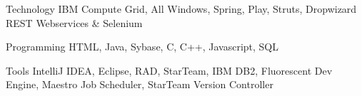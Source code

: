 

\begin{cvskills}

  \cvskill
    {Technology} %
    {IBM Compute Grid, All Windows, Spring, Play, Struts, Dropwizard REST Webservices \& Selenium} %

  \cvskill
    {Programming} %
    {HTML, Java, Sybase, C, C++, Javascript, SQL} %

  \cvskill
    {Tools} %
    {IntelliJ IDEA, Eclipse, RAD, StarTeam, IBM DB2, Fluorescent Dev Engine, Maestro Job Scheduler, StarTeam Version Controller} %

\end{cvskills}
